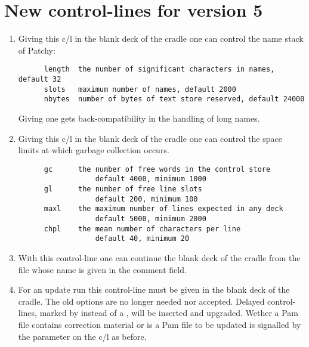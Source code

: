 \section{New control-lines for version 5}

\renewcommand{\labelenumi}{4.\theenumi)\ }

\begin{enumerate}
\item
{}

Giving this c/l in the blank deck of the cradle one can control the name
stack of Patchy:
\begin{verbatim}
      length  the number of significant characters in names, default 32
      slots   maximum number of names, default 2000
      nbytes  number of bytes of text store reserved, default 24000
\end{verbatim}
Giving  one gets back-compatibility in the handling
of long names.


\item
{}

Giving this c/l in the blank deck of the cradle one can control the space
limits at which garbage collection occurs.
\begin{verbatim}
      gc      the number of free words in the control store
                  default 4000, minimum 1000
      gl      the number of free line slots
                  default 200, minimum 100
      maxl    the maximum number of lines expected in any deck
                  default 5000, minimum 2000
      chpl    the mean number of characters per line
                  default 40, minimum 20
\end{verbatim}

\item
{}

With this control-line one can continue the blank deck of the cradle
from the file whose name is given in the comment field.


\item
{}

For an update run this control-line must be given in the blank deck of
the cradle. The old options  are no longer needed
nor accepted.
Delayed control-lines, marked by  instead of a ,
will be inserted and upgraded. Wether a Pam file contains correction
material or is a Pam file to be updated is signalled by the 
parameter on the c/l  as before.


\end{enumerate}
